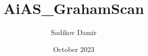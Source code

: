 

\title{AiAS\_GrahamScan}
\author{Sadikov Damir}
\date{October 2023}


	
	
	
	\large
	
	\tableofcontents
	\newpage
	
	
	
	
	
	
	
	
	
	
	
	
	

